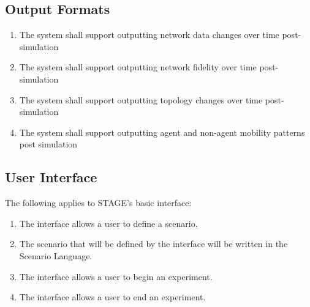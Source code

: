 \documentclass[titlepage]{article}
\begin{document}



\subsection{Output Formats%
  \label{output-formats}%
}

\begin{enumerate}
    \item The system shall support outputting network data changes over time post-simulation
		\item The system shall support outputting network fidelity over time post-simulation
		\item The system shall support outputting topology changes over time post-simulation
		\item The system shall support outputting agent and non-agent mobility patterns post simulation
\end{enumerate}


\subsection{User Interface%
  \label{user-interface}%
}

The following applies to STAGE's basic interface:
\begin{enumerate}
    \item The interface allows a user to define a scenario.
    \item The scenario that will be defined by the interface will be written in the Scenario Language.
    \item The interface allows a user to begin an experiment.
    \item The interface allows a user to end an experiment.
\end{enumerate}
\end{document}

